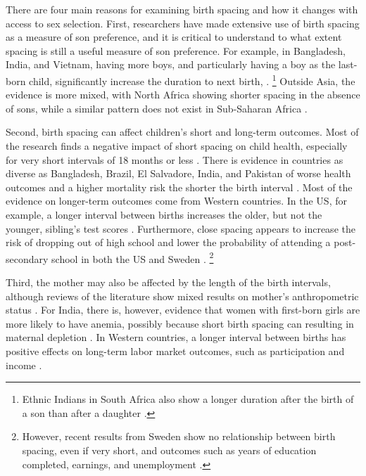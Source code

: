 \documentclass[12pt,letterpaper]{article}
\begin{document}
There are four main reasons for examining birth spacing and how it changes with 
access to sex selection.
First, researchers have made extensive use of birth spacing as a measure of son preference, 
and it is critical to understand to what extent spacing is still a useful measure of son 
preference.
For example, in Bangladesh, India, and Vietnam, having more boys, and particularly having 
a boy as the last-born child, significantly increase the duration to next birth,
\citep{Haughton1995,Haughton1996,Rahman1993,Bhalotra2008,Kumar2016,Soest2018}.%
\footnote{
Ethnic Indians in South Africa also show a longer duration after the birth of a 
son than after a daughter \citep{Gangadharan2003}.
}
Outside Asia, the evidence is more mixed, with North Africa showing shorter spacing in the 
absence of sons, while a similar pattern does not exist in Sub-Saharan Africa 
\citep{Rossi2015}.

Second, birth spacing can affect children's short and long-term outcomes.
Most of the research finds a negative impact of short spacing on child health, especially 
for very short intervals of 18 months or less \citep{Conde-Agudelo2006,Conde-Agudelo2012}.
There is evidence in countries as diverse as Bangladesh, Brazil, El Salvadore, India,
and Pakistan of worse health outcomes and a higher mortality risk the shorter the birth
interval
\citep{Cleland1984,Curtis1993,Whitworth2002,Bhargava2003,Rutstein2005,Bhalotra2008,Davanzo2008,Maitra2008,Makepeace2008,Gribble2009,Jayachandran2011,Saha2013,Jayachandran2017a,Ghosh2018}.
Most of the evidence on longer-term outcomes come from Western countries.
In the US, for example, a longer interval between births increases the older, but not the
younger, sibling's test scores \citep{Buckles2012}.
Furthermore, close spacing appears to increase the risk of dropping out of
high school and lower the probability of attending a post-secondary school in both the
US and Sweden \citep{Powell1993,Pettersson-Lidbom2009}.%
\footnote{
However, recent results from Sweden show no relationship between birth spacing, even if 
very short, and outcomes such as years of education completed, earnings, and unemployment 
\citep{Barclay2017}.
}

Third, the mother may also be affected by the length of the birth intervals, although 
reviews of the literature show mixed results on mother's anthropometric status 
\citep{Dewey2007,Conde-Agudelo2012}.
For India, there is, however, evidence that women with first-born girls are more likely to 
have anemia, possibly because short birth spacing can resulting in maternal depletion 
\citep{Milazzo2018}.
In Western countries, a longer interval between births has positive effects on long-term 
labor market outcomes, such as participation and income \citep{Gough2017,Karimi2014}.
\end{document}
